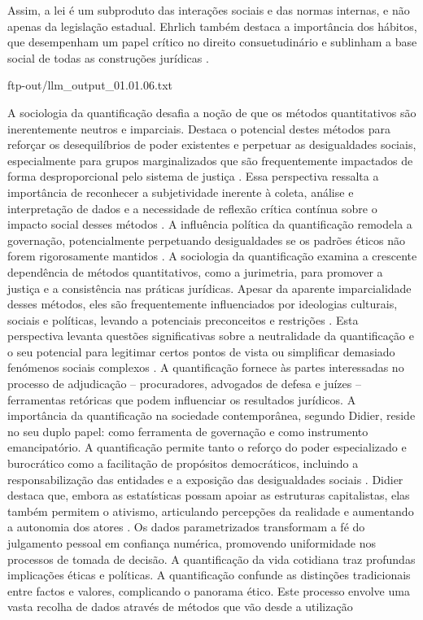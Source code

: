 Assim, a lei é um subproduto das interações sociais e das normas internas, e não apenas da legislação estadual. Ehrlich também destaca a importância dos hábitos, que desempenham um papel crítico no direito consuetudinário e sublinham a base social de todas as construções jurídicas \cite{venturini2024, venturini2024p24-25, venturini2024p22-23, venturini2024p18-19}. 

ftp-out/llm_output_01.01.06.txt

A sociologia da quantificação desafia a noção de que os métodos quantitativos são inerentemente neutros e imparciais. Destaca o potencial destes métodos para reforçar os desequilíbrios de poder existentes e perpetuar as desigualdades sociais, especialmente para grupos marginalizados que são frequentemente impactados de forma desproporcional pelo sistema de justiça \cite{10.5040/9781350220645,10.1080/07329113.2015.1046739}. Essa perspectiva ressalta a importância de reconhecer a subjetividade inerente à coleta, análise e interpretação de dados e a necessidade de reflexão crítica contínua sobre o impacto social desses métodos \cite{10.5040/9781350220645,10.1080/07329113.2015.1046739}. A influência política da quantificação remodela a governação, potencialmente perpetuando desigualdades se os padrões éticos não forem rigorosamente mantidos \cite{camargo2022}. A sociologia da quantificação examina a crescente dependência de métodos quantitativos, como a jurimetria, para promover a justiça e a consistência nas práticas jurídicas. Apesar da aparente imparcialidade desses métodos, eles são frequentemente influenciados por ideologias culturais, sociais e políticas, levando a potenciais preconceitos e restrições \cite{10.1057/s41599-020-00557-0,de2010jurimetrics,10.1177/09596801221075807}. Esta perspectiva levanta questões significativas sobre a neutralidade da quantificação e o seu potencial para legitimar certos pontos de vista ou simplificar demasiado fenómenos sociais complexos \cite{10.1111/ilr.12067,10.20396/rdbci.v18i0.8658889}. A quantificação fornece às partes interessadas no processo de adjudicação – procuradores, advogados de defesa e juízes – ferramentas retóricas que podem influenciar os resultados jurídicos. A importância da quantificação na sociedade contemporânea, segundo Didier, reside no seu duplo papel: como ferramenta de governação e como instrumento emancipatório. A quantificação permite tanto o reforço do poder especializado e burocrático como a facilitação de propósitos democráticos, incluindo a responsabilização das entidades e a exposição das desigualdades sociais \cite{demortain2019,didier2021,paiva2021}. Didier destaca que, embora as estatísticas possam apoiar as estruturas capitalistas, elas também permitem o ativismo, articulando percepções da realidade e aumentando a autonomia dos atores \cite{didier2021}. Os dados parametrizados transformam a fé do julgamento pessoal em confiança numérica, promovendo uniformidade nos processos de tomada de decisão. A quantificação da vida cotidiana traz profundas implicações éticas e políticas. A quantificação confunde as distinções tradicionais entre factos e valores, complicando o panorama ético. Este processo envolve uma vasta recolha de dados através de métodos que vão desde a utilização 